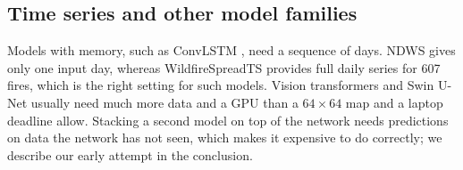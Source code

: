 \subsection{Time series and other model families}
Models with memory, such as ConvLSTM \cite{shi2015convlstm}, need a sequence of days. NDWS gives only one input day, whereas WildfireSpreadTS \cite{gerard2023wildfirespreadts} provides full daily series for 607 fires, which is the right setting for such models. Vision transformers and Swin U-Net \cite{dosovitskiy2021vit,cao2022swinunet} usually need much more data and a GPU than a $64\times64$ map and a laptop deadline allow. Stacking a second model on top of the network \cite{wolpert1992stacked} needs predictions on data the network has not seen, which makes it expensive to do correctly; we describe our early attempt in the conclusion.
